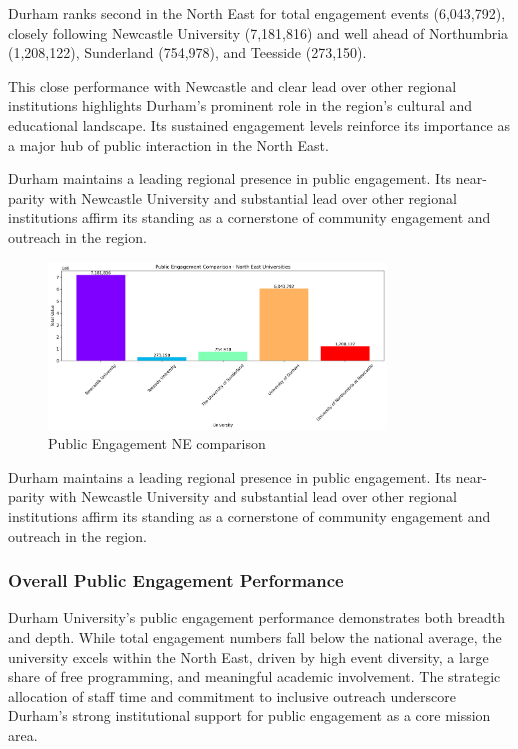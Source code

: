 \documentclass[journal,onecolumn, 10pt,draftclsnofoot]{IEEEtran}
\begin{document}
Durham ranks second in the North East for total engagement events (6,043,792), closely following Newcastle University (7,181,816) and well ahead of Northumbria (1,208,122), Sunderland (754,978), and Teesside (273,150).

This close performance with Newcastle and clear lead over other regional institutions highlights Durham's prominent role in the region's cultural and educational landscape. Its sustained engagement levels reinforce its importance as a major hub of public interaction in the North East.



Durham maintains a leading regional presence in public engagement. Its near-parity with Newcastle University and substantial lead over other regional institutions affirm its standing as a cornerstone of community engagement and outreach in the region.

\begin{figure}[h]
\centering
\includegraphics[width=0.8\textwidth]{Fig/figure34.ne_comparison.png}
\caption{Public Engagement NE comparison}
\label{fig:ne-comparison}
\end{figure}

Durham maintains a leading regional presence in public engagement. Its near-parity with Newcastle University and substantial lead over other regional institutions affirm its standing as a cornerstone of community engagement and outreach in the region.

\subsubsection{Overall Public Engagement Performance}

Durham University's public engagement performance demonstrates both breadth and depth. While total engagement numbers fall below the national average, the university excels within the North East, driven by high event diversity, a large share of free programming, and meaningful academic involvement. The strategic allocation of staff time and commitment to inclusive outreach underscore Durham's strong institutional support for public engagement as a core mission area.
\end{document}
